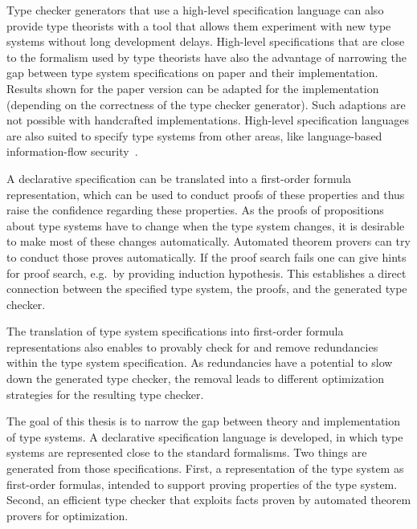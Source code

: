 Type checker generators that use a high-level specification language
can also provide type theorists with a tool that allows them
experiment with new type systems without long development
delays. High-level specifications that are close to the formalism used
by type theorists have also the advantage of narrowing the gap between
type system specifications on paper and their implementation. Results
shown for the paper version can be adapted for the implementation
(depending on the correctness of the type checker generator). Such
adaptions are not possible with handcrafted
implementations. High-level specification languages are also suited to
specify type systems from other areas, like language-based
information-flow security~\cite{Sabelfeld:2006:LIS:2312191.2314769}.

A declarative specification can be translated into a first-order
formula representation, which can be used to conduct proofs of these
properties and thus raise the confidence regarding these
properties. As the proofs of propositions about type systems have to
change when the type system changes, it is desirable to make most of
these changes automatically. Automated theorem provers can try to
conduct those proves automatically. If the proof search fails one can
give hints for proof search, e.g.\ by providing induction
hypothesis. This establishes a direct connection between the specified
type system, the proofs, and the generated type checker.

The translation of type system specifications into first-order formula
representations also enables to provably check for and remove
redundancies within the type system specification. As redundancies
have a potential to slow down the generated type checker, the removal
leads to different optimization strategies for the resulting type
checker.

The goal of this thesis is to narrow the gap between theory and
implementation of type systems. A declarative specification language
is developed, in which type systems are represented close to the
standard formalisms. Two things are generated from those
specifications. First, a representation of the type system as
first-order formulas, intended to support proving properties of the
type system. Second, an efficient type checker that exploits facts
proven by automated theorem provers for optimization.

